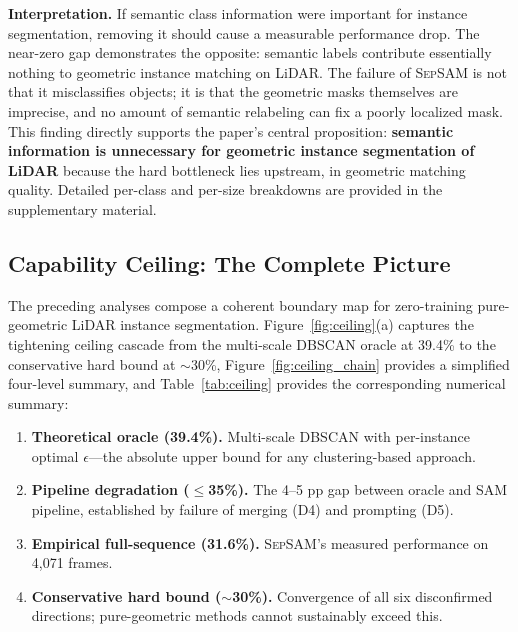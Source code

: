 \documentclass{article}
\begin{document}
\textbf{Interpretation.} If semantic class information were important for instance
segmentation, removing it should cause a measurable performance drop. The near-zero
gap demonstrates the opposite: semantic labels contribute essentially nothing to
geometric instance matching on LiDAR. The failure of \textsc{SepSAM} is not that it
misclassifies objects; it is that the geometric masks themselves are imprecise, and
no amount of semantic relabeling can fix a poorly localized mask. This finding
directly supports the paper's central proposition: \textbf{semantic information is
unnecessary for geometric instance segmentation of LiDAR} because the hard bottleneck
lies upstream, in geometric matching quality. Detailed per-class and per-size breakdowns are provided in the supplementary
material.

\subsection{Capability Ceiling: The Complete Picture}

The preceding analyses compose a coherent boundary map for zero-training
pure-geometric LiDAR instance segmentation. Figure~\ref{fig:ceiling}(a) captures the tightening ceiling cascade from the
multi-scale DBSCAN oracle at 39.4\% to the conservative hard bound at $\sim$30\%,
Figure~\ref{fig:ceiling_chain} provides a simplified four-level summary,
and Table~\ref{tab:ceiling} provides the corresponding numerical summary:

\begin{enumerate}
    \item \textbf{Theoretical oracle (39.4\%).} Multi-scale DBSCAN with per-instance
    optimal $\epsilon$---the absolute upper bound for any clustering-based approach.
    \item \textbf{Pipeline degradation ($\leq$35\%).} The 4--5 pp gap between oracle
    and SAM pipeline, established by failure of merging (D4) and prompting (D5).
    \item \textbf{Empirical full-sequence (31.6\%).} \textsc{SepSAM}'s measured
    performance on 4,071 frames.
    \item \textbf{Conservative hard bound ($\sim$30\%).} Convergence of all six
    disconfirmed directions; pure-geometric methods cannot sustainably exceed this.
\end{enumerate}
\end{document}
